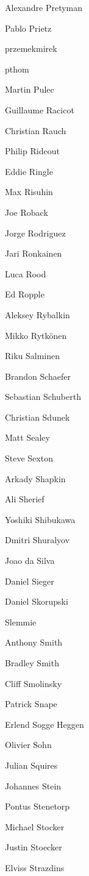 \begin{DoxyItemize}
\item Alexandre Pretyman
\item Pablo Prietz
\item przemekmirek
\item pthom
\item Martin Pulec
\item Guillaume Racicot
\item Christian Rauch
\item Philip Rideout
\item Eddie Ringle
\item Max Risuhin
\item Joe Roback
\item Jorge Rodriguez
\item Jari Ronkainen
\item Luca Rood
\item Ed Ropple
\item Aleksey Rybalkin
\item Mikko Rytkönen
\item Riku Salminen
\item Brandon Schaefer
\item Sebastian Schuberth
\item Christian Sdunek
\item Matt Sealey
\item Steve Sexton
\item Arkady Shapkin
\item Ali Sherief
\item Yoshiki Shibukawa
\item Dmitri Shuralyov
\item Joao da Silva
\item Daniel Sieger
\item Daniel Skorupski
\item Slemmie
\item Anthony Smith
\item Bradley Smith
\item Cliff Smolinsky
\item Patrick Snape
\item Erlend Sogge Heggen
\item Olivier Sohn
\item Julian Squires
\item Johannes Stein
\item Pontus Stenetorp
\item Michael Stocker
\item Justin Stoecker
\item Elviss Strazdins

\end{DoxyItemize}
